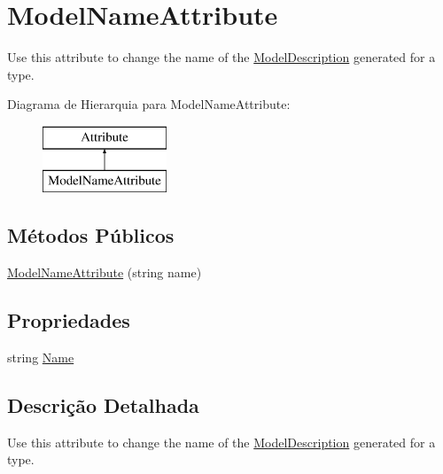 \hypertarget{classApi3Layers_1_1Areas_1_1HelpPage_1_1ModelDescriptions_1_1ModelNameAttribute}{}\section{Model\+Name\+Attribute}
\label{classApi3Layers_1_1Areas_1_1HelpPage_1_1ModelDescriptions_1_1ModelNameAttribute}


Use this attribute to change the name of the \hyperlink{classApi3Layers_1_1Areas_1_1HelpPage_1_1ModelDescriptions_1_1ModelDescription}{Model\+Description} generated for a type.  


Diagrama de Hierarquia para Model\+Name\+Attribute\+:\begin{figure}[H]
\begin{center}
\leavevmode
\includegraphics[height=2.000000cm]{d0/dac/classApi3Layers_1_1Areas_1_1HelpPage_1_1ModelDescriptions_1_1ModelNameAttribute}
\end{center}
\end{figure}
\subsection*{Métodos Públicos}
\begin{DoxyCompactItemize}
\item 
\hyperlink{classApi3Layers_1_1Areas_1_1HelpPage_1_1ModelDescriptions_1_1ModelNameAttribute_a0e5f4a1f1b6fb75cb7804f6905744f39}{Model\+Name\+Attribute} (string name)
\end{DoxyCompactItemize}
\subsection*{Propriedades}
\begin{DoxyCompactItemize}
\item 
string \hyperlink{classApi3Layers_1_1Areas_1_1HelpPage_1_1ModelDescriptions_1_1ModelNameAttribute_a7ee9065718e6628dc7791b756fa6c0f9}{Name}
\end{DoxyCompactItemize}


\subsection{Descrição Detalhada}
Use this attribute to change the name of the \hyperlink{classApi3Layers_1_1Areas_1_1HelpPage_1_1ModelDescriptions_1_1ModelDescription}{Model\+Description} generated for a type. 



